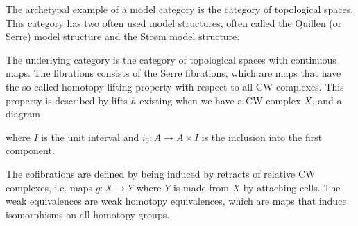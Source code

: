 The archetypal example of a model category is the category of topological spaces. This category has two often used model structures, often called the Quillen (or Serre) model structure and the Strøm model structure. 

\begin{example}
\label{ex:quillen_model}
The underlying category is the category of topological spaces with continuous maps. The fibrations consists of the Serre fibrations, which are maps that have the so called homotopy lifting property with respect to all CW complexes. This property is described by lifts $h$ existing when we have a CW complex $X$, and a diagram
\begin{center}
\end{center}
where $I$ is the unit interval and $i_0:A\longrightarrow A\times I$ is the inclusion into the first component. 

The cofibrations are defined by being induced by retracts of relative CW complexes, i.e. maps $g:X\longrightarrow Y$ where $Y$ is made from $X$ by attaching cells. The weak equivalences are weak homotopy equivalences, which are maps that induce isomorphisms on all homotopy groups. 
\end{example}

